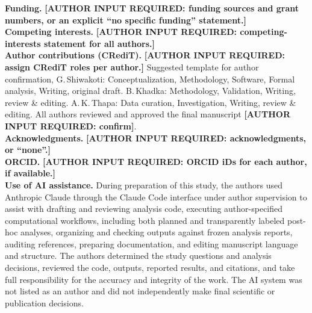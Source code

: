 \documentclass[11pt,a4paper]{article}
\begin{document}
\textbf{Funding.} \textbf{[AUTHOR INPUT REQUIRED: funding sources and grant numbers, or an explicit ``no specific funding'' statement.]}\\
\textbf{Competing interests.} \textbf{[AUTHOR INPUT REQUIRED: competing-interests statement for all authors.]}\\
\textbf{Author contributions (CRediT).} \textbf{[AUTHOR INPUT REQUIRED: assign CRediT roles per author.]} Suggested template for author confirmation, G.\,Shiwakoti: Conceptualization, Methodology, Software, Formal analysis, Writing, original draft. B.\,Khadka: Methodology, Validation, Writing, review \& editing. A.\,K.\,Thapa: Data curation, Investigation, Writing, review \& editing. All authors reviewed and approved the final manuscript \textbf{[AUTHOR INPUT REQUIRED: confirm]}.\\
\textbf{Acknowledgments.} \textbf{[AUTHOR INPUT REQUIRED: acknowledgments, or ``none''.]}\\
\textbf{ORCID.} \textbf{[AUTHOR INPUT REQUIRED: ORCID iDs for each author, if available.]}\\
\textbf{Use of AI assistance.} During preparation of this study, the authors used Anthropic Claude through the Claude Code interface under author supervision to assist with drafting and reviewing analysis code, executing author-specified computational workflows, including both planned and transparently labeled post-hoc analyses, organizing and checking outputs against frozen analysis reports, auditing references, preparing documentation, and editing manuscript language and structure. The authors determined the study questions and analysis decisions, reviewed the code, outputs, reported results, and citations, and take full responsibility for the accuracy and integrity of the work. The AI system was not listed as an author and did not independently make final scientific or publication decisions.
\end{document}
